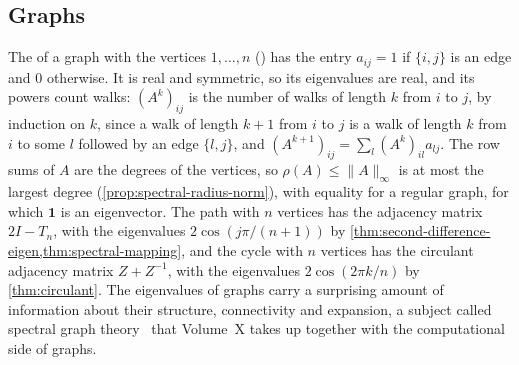 \subsection{Graphs}

The  of a graph with the vertices $1,\ldots,n$ () has the entry $a_{ij}=1$ if $\{i,j\}$ is an edge and $0$ otherwise. It is real and symmetric, so its eigenvalues are real, and its powers count walks: $(A^k)_{ij}$ is the number of walks of length $k$ from $i$ to $j$, by induction on $k$, since a walk of length $k+1$ from $i$ to $j$ is a walk of length $k$ from $i$ to some $l$ followed by an edge $\{l,j\}$, and $(A^{k+1})_{ij}=\sum_l(A^k)_{il}a_{lj}$. The row sums of $A$ are the degrees of the vertices, so $\rho(A)\le\|A\|_\infty$ is at most the largest degree (\cref{prop:spectral-radius-norm}), with equality for a regular graph, for which $\mathbf 1$ is an eigenvector. The path with $n$ vertices has the adjacency matrix $2I-T_n$, with the eigenvalues $2\cos(j\pi/(n+1))$ by \cref{thm:second-difference-eigen,thm:spectral-mapping}, and the cycle with $n$ vertices has the circulant adjacency matrix $Z+Z^{-1}$, with the eigenvalues $2\cos(2\pi k/n)$ by \cref{thm:circulant}. The eigenvalues of graphs carry a surprising amount of information about their structure, connectivity and expansion, a subject called spectral graph theory~\cite{biggs1993,godsil2001} that Volume~X takes up together with the computational side of graphs.

\begin{table}
\end{table}


